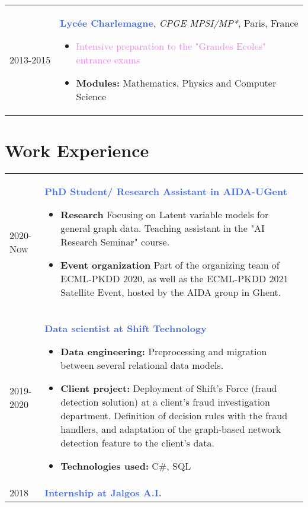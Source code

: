 \documentclass[a4paper,10pt]{article} %
\begin{document}
{\begin{tabular}{p{2cm}p{15cm}}
	\textsc{2013}-2015  & \textcolor{royalblue}{\textbf{Lyc\'{e}e Charlemagne}}, \emph{CPGE MPSI/MP*}, Paris, France
	\begin{itemize}
		\item \textcolor{violet}{Intensive preparation to the "Grandes Ecoles" entrance exams}
		\item \textcolor{pinegreen}{\textbf{Modules:}} Mathematics, Physics and Computer Science
	\end{itemize}
\end{tabular}


\section{Work Experience}

\begin{tabular}{p{2cm}p{15cm}}

	\textsc{2020-Now} & \textcolor{royalblue}{\textbf{PhD Student/ Research Assistant in AIDA-UGent}}
	\begin{itemize}
		\item \textcolor{pinegreen}{\textbf{Research}} Focusing on Latent variable models for general graph data. Teaching assistant in the "AI Research Seminar" course.
		\item \textcolor{pinegreen}{\textbf{Event organization}} Part of the organizing team of ECML-PKDD 2020, as well as the ECML-PKDD 2021 Satellite Event, hosted by the AIDA group in Ghent.
	\end{itemize}  \\
	\textsc{2019-2020} & \textcolor{royalblue}{\textbf{Data scientist at Shift Technology}}
	\begin{itemize}
		\item \textcolor{pinegreen}{\textbf{Data engineering:}} Preprocessing and migration between several relational data models.
		\item \textcolor{pinegreen}{\textbf{Client project:}} Deployment of Shift's Force (fraud detection solution) at a client's fraud investigation department. Definition of decision rules with the fraud handlers, and adaptation of the graph-based network detection feature to the client's data.
		\item \textcolor{pinegreen}{\textbf{Technologies used:}} C\#, SQL
	\end{itemize}                                                               \\
	\textsc{2018}      & \textcolor{royalblue}{\textbf{Internship at Jalgos A.I.}}


\end{tabular}}
\end{document}
